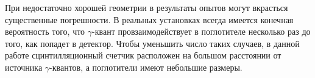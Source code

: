 \documentclass[a4paper, 12pt]{article}%
\begin{document}
	При недостаточно хорошей геометрии в результаты опытов могут
	вкрасться существенные погрешности. В реальных установках всегда имеется конечная вероятность того, что $\gamma$-квант провзаимодействует в
	поглотителе несколько раз до того, как попадет в детектор. Чтобы уменьшить число таких случаев, в данной работе сцинтилляционный счетчик расположен на большом расстоянии от источника $\gamma$-квантов, а поглотители имеют небольшие
	размеры.
	
	
	
	
	
	
	
	
	
	
	
	
	
	
	
	
	
	
	
	
	
	
	
	
	
	
	
	
	
	
	
	
\end{document}
